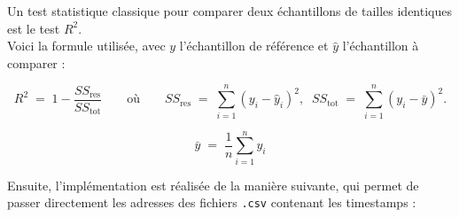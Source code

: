 Un test statistique classique pour comparer deux échantillons de tailles identiques est le test $R^2$.\\
Voici la formule utilisée, avec $y$ l'échantillon de référence et $\hat{y}$ l'échantillon à comparer :

\[
R^2 \;=\; 1 - \frac{SS_{\mathrm{res}}}{SS_{\mathrm{tot}}}
\qquad\text{où}\qquad
SS_{\mathrm{res}} \;=\; \sum_{i=1}^{n} (y_i - \hat{y}_i)^2,
\;\;
SS_{\mathrm{tot}} \;=\; \sum_{i=1}^{n} (y_i - \bar{y})^2.
\]

\[
\bar{y} \;=\; \frac{1}{n}\sum_{i=1}^{n} y_i\]


Ensuite, l'implémentation est réalisée de la manière suivante, qui permet de passer directement les adresses des fichiers \verb!.csv! contenant les timestamps :

